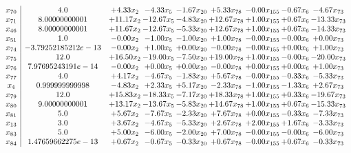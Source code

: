 \documentclass[8pt]{article}
\begin{document}
\[\begin{array}{c| c c@{\hskip 2pt} c@{\hskip 2pt} c@{\hskip 2pt} c@{\hskip 2pt} c@{\hskip 2pt} c@{\hskip 2pt} c@{\hskip 2pt} }
 x_{70}   &  4.0 & +  4.33 x_{2} & -4.33 x_{5} & -1.67 x_{20} & +  5.33 x_{78} & -0.00 x_{155} & -0.67 x_{6} & -4.67 x_{73}\\
 x_{71}   &  8.00000000001 & + 11.17 x_{2} & -12.67 x_{5} & -4.83 x_{20} & + 12.67 x_{78} & +  1.00 x_{155} & +  0.67 x_{6} & -13.33 x_{73}\\
 x_{46}   &  8.00000000001 & + 11.67 x_{2} & -12.67 x_{5} & -5.33 x_{20} & + 12.67 x_{78} & +  1.00 x_{155} & +  0.67 x_{6} & -14.33 x_{73}\\
 x_{51}   &  1.0 & -0.00 x_{2} & -1.00 x_{5} & -1.00 x_{20} & +  1.00 x_{78} & -0.00 x_{155} & -0.00 x_{6} & +  0.00 x_{73}\\
 x_{74}   &  -3.79252185212e-13 & -0.00 x_{2} & +  1.00 x_{5} & +  0.00 x_{20} & -0.00 x_{78} & -0.00 x_{155} & +  0.00 x_{6} & +  1.00 x_{73}\\
 x_{75}   &  12.0 & + 16.50 x_{2} & -19.00 x_{5} & -7.50 x_{20} & + 19.00 x_{78} & +  1.00 x_{155} & -0.00 x_{6} & -20.00 x_{73}\\
 x_{76}   &  7.97695243191e-14 & -0.00 x_{2} & +  0.00 x_{5} & +  0.00 x_{20} & -0.00 x_{78} & +  0.00 x_{155} & +  0.00 x_{6} & +  1.00 x_{73}\\
 x_{77}   &  4.0 & +  4.17 x_{2} & -4.67 x_{5} & -1.83 x_{20} & +  5.67 x_{78} & -0.00 x_{155} & -0.33 x_{6} & -5.33 x_{73}\\
 x_{4}   &  0.999999999998 & -4.83 x_{2} & +  2.33 x_{5} & +  5.17 x_{20} & -2.33 x_{78} & -1.00 x_{155} & -1.33 x_{6} & +  2.67 x_{73}\\
 x_{79}   &  12.0 & + 15.83 x_{2} & -18.33 x_{5} & -7.17 x_{20} & + 18.33 x_{78} & +  1.00 x_{155} & +  0.33 x_{6} & -19.67 x_{73}\\
 x_{80}   &  9.00000000001 & + 13.17 x_{2} & -13.67 x_{5} & -5.83 x_{20} & + 14.67 x_{78} & +  1.00 x_{155} & +  0.67 x_{6} & -15.33 x_{73}\\
 x_{81}   &  5.0 & +  5.67 x_{2} & -7.67 x_{5} & -2.33 x_{20} & +  7.67 x_{78} & +  0.00 x_{155} & -0.33 x_{6} & -7.33 x_{73}\\
 x_{13}   &  3.0 & +  3.67 x_{2} & -4.67 x_{5} & -5.33 x_{20} & +  2.67 x_{78} & +  2.00 x_{155} & +  1.67 x_{6} & -3.33 x_{73}\\
 x_{83}   &  5.0 & +  5.00 x_{2} & -6.00 x_{5} & -2.00 x_{20} & +  7.00 x_{78} & -0.00 x_{155} & -0.00 x_{6} & -6.00 x_{73}\\
 x_{84}   &  1.47659662275e-13 & +  0.67 x_{2} & -0.67 x_{5} & -0.33 x_{20} & +  0.67 x_{78} & -0.00 x_{155} & +  0.67 x_{6} & -0.33 x_{73}\\

\end{array}\]
\end{document}
